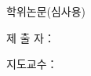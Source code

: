 \thispagestyle{empty}
\begin{center}
  \begin{flushright}
  {\fontsize{10}{17}\selectfont \degreetype 학위논문(심사용)}
  \end{flushright}

  \vspace{10mm}

  {\fontsize{20}{26}\selectfont \thesistitleko}
  
  {\fontsize{15}{26}\selectfont \thesistitlekosub}

  \vspace{8mm}

  {\fontsize{13}{16}\selectfont \thesistitlenone}

  {\fontsize{13}{16}\selectfont \thesistitlentwo}

  \vspace{35mm}

  {\fontsize{13}{17}\selectfont 제 출 자：\authorname}

  \vspace{5mm}

  {\fontsize{13}{17}\selectfont 지도교수：\advisorname}

  \vspace{30mm}

  {\fontsize{15}{17}\selectfont \submityear}

  \vspace{15mm}

  {\fontsize{14}{18}\selectfont \department}

  \vspace{3mm}

  {\fontsize{14}{18}\selectfont \major}

  \vspace{5mm}

  {\fontsize{15}{19}\selectfont \gradschool}
\end{center}
\newpage